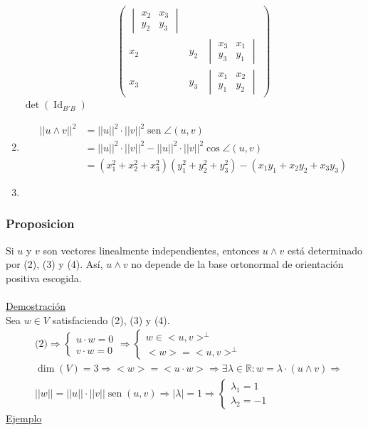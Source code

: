 \documentclass[12pt, a4paper, ones, notitlepage, openany,titlepage]{article}
\begin{document}
\begin{enumerate}
$$\begin{pmatrix}
\begin{vmatrix}
			x_2 & x_3 \\
			y_2 & y_3
		\end{vmatrix} \\
		x_2 & y_2 & \begin{vmatrix}
			x_3 & x_1 \\
			y_3 & y_1
		\end{vmatrix}\\
		x_3 & y_3 & \begin{vmatrix}
			x_1 & x_2 \\
			y_1 & y_2
		\end{vmatrix}
	\end{pmatrix}
	$$
	$\operatorname{det}(\operatorname{Id}_{B'B})$
	\item
	\begin{align*}
		||u \wedge v||^2 & = ||u||^2 \cdot ||v||^2 \operatorname{sen} 	\angle (u,v) \\
		& = ||u||^2 \cdot ||v||^2 - ||u||^2 \cdot ||v||^2 	\operatorname{cos} \angle (u,v) \\
		& = (x^2_1 + x^2_2 + x^2_3)(y^2_1 + y^2_2 + y^2_3) - 
		(x_1 y_1 + x_2 y_2 + x_3 y_3)
	\end{align*}
	\item 
\end{enumerate}

\subsubsection{Proposicion}
Si $u$ y $v$ son vectores linealmente independientes, entonces $u \wedge v$ está determinado por (2), (3) y (4). Así, $u \wedge v$ no depende de la base ortonormal de orientación positiva escogida.\\\\
\underline{Demostración}\\
Sea $w \in V$ satisfaciendo (2), (3) y (4).
\begin{align*}
	& \text{(2)} \Longrightarrow  
	\begin{cases}
		u \cdot w = 0 \\
		v \cdot w = 0
	\end{cases}
	\Longrightarrow
	\begin{cases}
		w \in <u,v>^\bot \\
		<w> = <u,v>^\bot
	\end{cases}\\
	& \operatorname{dim}(V) = 3 \Longrightarrow <w> = <u \cdot w> \Longrightarrow \exists \lambda \in \mathbb{R} : w = \lambda \cdot (u \wedge v)
	\Longrightarrow \\
	& ||w|| = ||u|| \cdot ||v|| \operatorname{sen}(u,v) \Longrightarrow |\lambda| = 1 \Longrightarrow \begin{cases}
		\lambda_1 = 1 \\
		\lambda_2 = -1
	\end{cases}
\end{align*}
\underline{Ejemplo}\\
\end{document}
